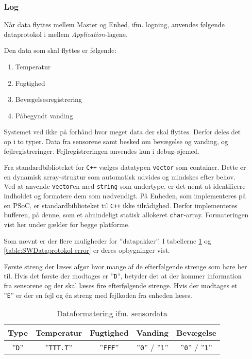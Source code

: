 
\subsubsection{Log}

Når data flyttes mellem Master og Enhed, ifm. logning, anvendes følgende dataprotokol i mellem \textit{Application}-lagene.

Den data som skal flyttes er følgende:

\begin{enumerate}
	\item Temperatur
	\item Fugtighed
	\item Bevægelsesregistrering
	\item Påbegyndt vanding
\end{enumerate}

Systemet ved ikke på forhånd hvor meget data der skal flyttes. Derfor deles det op i to typer. Data fra sensorene samt besked om bevægelse og vanding, og fejlregistreringer. Fejlregistreringen anvendes kun i debug-øjemed.

Fra standardbiblioteket for \verb'C++' vælges datatypen \verb+vector+ som container. Dette er en dynamisk array-struktur som automatisk udvides og mindskes efter behov.
Ved at anvende \verb+vector+en med \verb+string+ som undertype, er det nemt at identificere indholdet og formatere dem som nødvendigt. På Enheden, som implementeres på en PSoC, er standardbiblioteket til \verb-C++- ikke tilrådighed. Derfor implementeres bufferen, på denne, som et almindeligt statisk allokeret \verb+char+-array. Formateringen vist her under gælder for begge platforme.

Som nævnt er der flere muligheder for ''datapakker''. I tabellerne \ref{table:SWDataprotokol-sensor} og \ref{table:SWDataprotokol-error} er deres opbygninger vist.

Første streng der læses afgør hvor mange af de efterfølgende strenge som høre her til. Hvis det første der modtages er ''\verb+D+'', betyder det at der kommer information fra sensorene og der skal læses fire efterfølgende strenge.
Hvis der modtages et ''\verb+E+'' er der en fejl og én streng med fejlkoden fra enheden læses.

\begin{table}[h]
	\caption{Dataformatering ifm. sensordata}
	\centering
	\begin{tabular}{|c|c|c|c|c|}
		\hline 
		\textbf{Type} & \textbf{Temperatur} & \textbf{Fugtighed} & \textbf{Vanding} & \textbf{Bevægelse}\\ 
		\hline 
		''\verb+D+'' & ''\verb+TTT.T+'' & ''\verb+FFF+'' & ''\verb+0+'' / ''\verb+1+'' & ''\verb+0+'' / ''\verb+1+'' \\ 
		\hline 
	\end{tabular} 
	\label{table:SWDataprotokol-sensor}
\end{table}

